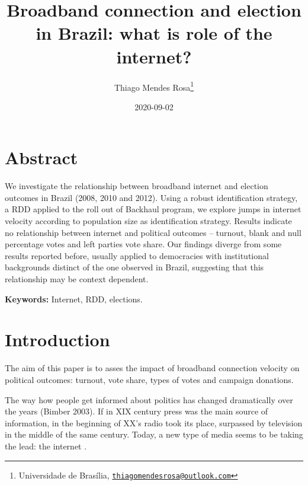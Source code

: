 \documentclass[
  12pt,
]{article}
\title{Broadband connection and election in Brazil: what is role of the
internet?}
\author{Thiago Mendes Rosa\footnote{Universidade de Brasília,
  \href{mailto:thiagomendesrosa@outlook.com}{\nolinkurl{thiagomendesrosa@outlook.com}}}}
\date{2020-09-02}
\begin{document}
\maketitle

\allsectionsfont{\centering}

\hypertarget{abstract}{%
\section*{Abstract}\label{abstract}}

We investigate the relationship between broadband internet and election
outcomes in Brazil (2008, 2010 and 2012). Using a robust identification
strategy, a RDD applied to the roll out of Backhaul program, we explore
jumps in internet velocity according to population size as
identification strategy. Results indicate no relationship between
internet and political outcomes -- turnout, blank and null percentage
votes and left parties vote share. Our findings diverge from some
results reported before, usually applied to democracies with
institutional backgrounds distinct of the one observed in Brazil,
suggesting that this relationship may be context dependent.

\textbf{Keywords:} Internet, RDD, elections.

\allsectionsfont{\raggedright}

\clearpage

\hypertarget{introduction}{%
\section{Introduction}\label{introduction}}

The aim of this paper is to asses the impact of broadband connection
velocity on political outcomes: turnout, vote share, types of votes and
campaign donations.

The way how people get informed about politics has changed dramatically
over the years (Bimber 2003). If in XIX century press was the main
source of information, in the beginning of XX's radio took its place,
surpassed by television in the middle of the same century. Today, a new
type of media seems to be taking the lead: the internet .
\end{document}
